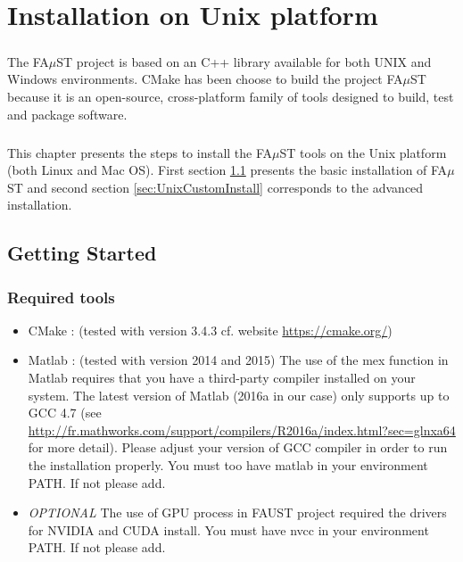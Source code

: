 \chapter{Installation on Unix platform}\label{sec:InstallUnix}

\paragraph{}The FA$\mu$ST project is based on an C++ library available for both UNIX and Windows environments. CMake has been choose to build the project FA$\mu$ST because it is an open-source, cross-platform family of tools designed to build, test and package software.

\paragraph{}This chapter presents the steps to install the FA$\mu$ST tools on the Unix platform (both Linux and Mac OS). First section \ref{sec:UnixGettingStarted} presents the basic installation of FA$\mu$ST and second section \ref{sec:UnixCustomInstall} corresponds to the advanced  installation.

\section{Getting Started}\label{sec:UnixGettingStarted}

\subsection{Required tools}\label{sec:RequiredTools}

\begin{itemize}
\item CMake : (tested with version 3.4.3 cf. website \url{https://cmake.org/})
\item Matlab : (tested with version 2014 and 2015)
The use of the mex function in Matlab requires that you have a third-party compiler installed on your system. The latest version of Matlab (2016a in our case) only supports up to GCC 4.7 (see \url{http://fr.mathworks.com/support/compilers/R2016a/index.html?sec=glnxa64} for more detail). Please adjust your version of GCC compiler in order to run the installation properly. 
You must too have matlab in your environment PATH. If not please add. 

\item \textit{OPTIONAL} The use of GPU process in FAUST project required the drivers for NVIDIA and CUDA install. You must have nvcc in your environment PATH. If not please add.
\end{itemize}

